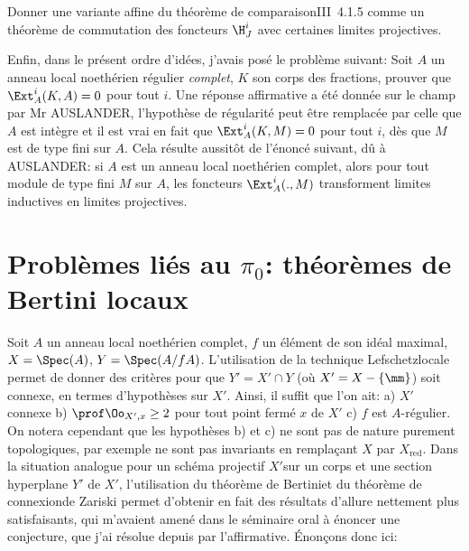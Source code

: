 \begin{probleme} \label{XIII.1.4}
Donner une variante affine du \og th\'eor\`eme de comparaison\fg \textup{\EGA III~4.1.5} comme un th\'eor\`eme de commutation des foncteurs $\H^i_J$ avec certaines limites projectives.
\end{probleme}

Enfin, dans le pr\'esent ordre d'id\'ees, j'avais pos\'e le probl\`eme suivant: Soit $A$ un anneau local noeth\'erien r\'egulier \emph{complet}, $K$ son corps des fractions, prouver que $\Ext^i_A(K, A)=0$ pour tout $i$. Une r\'eponse affirmative a \'et\'e donn\'ee sur le champ par Mr AUSLANDER, l'hypoth\`ese de r\'egularit\'e peut \^etre remplac\'ee par celle que $A$ est int\`egre et il est vrai en fait que $\Ext^i_A(K, M)=0$ pour tout $i$, d\`es que $M$ est de type fini sur $A$. Cela r\'esulte aussit\^{o}t de l'\'enonc\'e suivant, d\^u \`a AUSLANDER: si $A$ est un anneau local noeth\'erien complet, alors pour tout module de type fini $M$ sur $A$, les foncteurs $\Ext_A^i(., M)$ transforment limites inductives en limites projectives.

\section{Probl\`emes li\'es au $\pi_0$: th\'eor\`emes de Bertini locaux} \label{XIII.2}

Soit $A$ un anneau local noeth\'erien complet, $f$ un \'el\'ement de son
id\'eal maximal, $X=\Spec (A)$, $Y=\Spec(A/fA)$. L'utilisation de la
technique \og Lefschetz\fg locale permet de donner des crit\`eres
pour que $Y'=X'\cap Y$ (o\`u $X'=X-\{\mm\}$) soit connexe, en termes
d'hypoth\`eses sur $X'$. Ainsi, il suffit que l'on ait: a) $X'$\pageoriginale
connexe b) $\prof \Oo_{X', x} \ge 2$ pour tout point ferm\'e $x$
de $X'$ c) $f$ est $A$-r\'egulier. On notera cependant que les
hypoth\`eses b) et c) ne sont pas de nature purement
topologiques, par exemple ne sont pas invariants en
rempla\c cant $X$ par $X_{\text{red}}$. Dans la situation analogue
pour un sch\'ema projectif $X'$sur un corps et une section
hyperplane $Y'$ de $X'$, l'utilisation du \og th\'eor\`eme de
Bertini\fg et du \og th\'eor\`eme de connexion\fg de Zariski permet
d'obtenir en fait des r\'esultats d'allure nettement plus
satisfaisants, qui m'avaient amen\'e dans le s\'eminaire oral \`a
\'enoncer une conjecture, que j'ai r\'esolue depuis par l'affirmative.
\'Enon\c cons donc ici:

